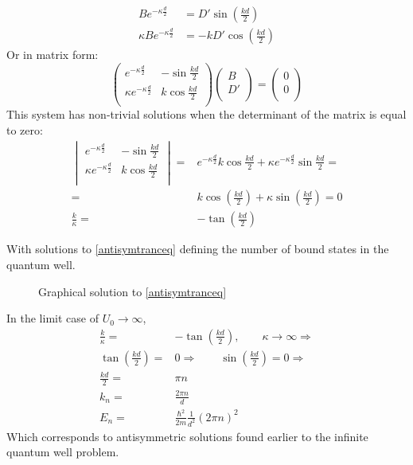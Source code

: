 				\begin{align}
					Be^{-\kappa \frac{d}{2}} &= D' \sin(\frac{kd}{2}) \\
					\kappa Be^{-\kappa \frac{d}{2}} &= -kD' \cos(\frac{kd}{2})			
				\end{align}
				Or in matrix form:
				\begin{equation}
				\begin{pmatrix}
				e^{-\kappa \frac{d}{2}}			&	-\sin{\frac{kd}{2}}	\\ 
				\kappa e^{-\kappa \frac{d}{2}}	&	k\cos{\frac{kd}{2}}	\\
				\end{pmatrix}
				\begin{pmatrix}
				B \\
				D' \\
				\end{pmatrix}
				=
				\begin{pmatrix}
				0 \\
				0 \\
				\end{pmatrix}			
				\end{equation}
				This system has non-trivial solutions when the determinant of the matrix is equal to zero:
				\begin{align}
					\begin{vmatrix}
						e^{-\kappa \frac{d}{2}}			&	-\sin{\frac{kd}{2}}	\\ 
						\kappa e^{-\kappa \frac{d}{2}}	&	k\cos{\frac{kd}{2}}	\\
					\end{vmatrix}
					=& e^{-\kappa\frac{d}{2}} k\cos{\frac{kd}{2}} + \kappa e^{-\kappa \frac{d}{2}} \sin{\frac{kd}{2}} =\\
					=& k\cos(\frac{kd}{2}) + \kappa\sin(\frac{kd}{2}) = 0 \\
					\frac{k}{\kappa} =& -\tan(\frac{kd}{2}) \label{antisymtranceq}
				\end{align}
				
				With solutions to \ref{antisymtranceq} defining the number of bound states in the quantum well. 
				\begin{figure}[!h]
					\centering
					
					\caption{Graphical solution to \ref{antisymtranceq}}
				\end{figure}
				
				In the limit case of $U_0 \rightarrow \infty$,
				\begin{align}
					\frac{k}{\kappa} =& -\tan(\frac{kd}{2}),\qquad \kappa \rightarrow \infty \Rightarrow \\
					\tan(\frac{kd}{2}) =& 0 \Rightarrow\qquad	\sin(\frac{kd}{2}) = 0 \Rightarrow\\
					\frac{kd}{2} =& \pi n \\
					k_n =& \frac{2\pi n}{d} \\
					E_n =& \frac{\hbar^2}{2m}\frac{1}{d^2}\left(2\pi n\right)^2
				\end{align}
				Which corresponds to antisymmetric solutions found earlier to the infinite quantum well problem.		
				
